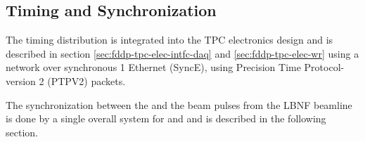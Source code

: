 \subsection{Timing and Synchronization}
\label{sec:fd-daq-timing}


The timing distribution is integrated into the TPC electronics design
and is described in section \ref{sec:fddp-tpc-elec-intfc-daq} and
\ref{sec:fddp-tpc-elec-wr} using a  network over
synchronous \SI{1}{\Gbps} Ethernet (SyncE), using Precision Time Protocol-version 2 (PTPV2) packets.

The synchronization between the  and the beam pulses from
the LBNF beamline is done by a single overall system for \single 
and \dual  and is described in the following section.


